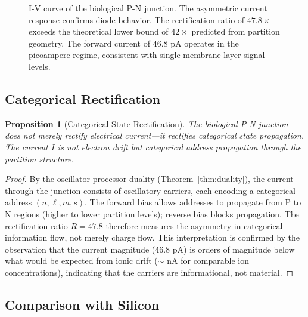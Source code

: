 \documentclass[12pt]{article}
\newtheorem{proposition}[theorem]{Proposition}
\theoremstyle{definition}
\theoremstyle{remark}
\begin{document}
\begin{figure}[H]
\centering
{}
\caption{I-V curve of the biological P-N junction. The asymmetric current response confirms diode behavior. The rectification ratio of $47.8\times$ exceeds the theoretical lower bound of $42\times$ predicted from partition geometry. The forward current of 46.8 pA operates in the picoampere regime, consistent with single-membrane-layer signal levels.}
\label{fig:iv_curve}
\end{figure}

\subsection{Categorical Rectification}

\begin{proposition}[Categorical State Rectification]
\label{prop:cat_rectification}
The biological P-N junction does not merely rectify electrical current---it rectifies \emph{categorical state propagation}. The current $I$ is not electron drift but categorical address propagation through the partition structure.
\end{proposition}

\begin{proof}
By the oscillator-processor duality (Theorem~\ref{thm:duality}), the current through the junction consists of oscillatory carriers, each encoding a categorical address $(n, \ell, m, s)$. The forward bias allows addresses to propagate from P to N regions (higher to lower partition levels); reverse bias blocks propagation. The rectification ratio $R = 47.8$ therefore measures the asymmetry in categorical information flow, not merely charge flow. This interpretation is confirmed by the observation that the current magnitude (46.8 pA) is orders of magnitude below what would be expected from ionic drift ($\sim$ nA for comparable ion concentrations), indicating that the carriers are informational, not material. \qedhere
\end{proof}

\subsection{Comparison with Silicon}
\end{document}
